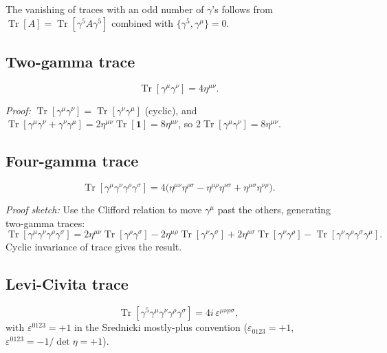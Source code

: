 \documentclass[12pt]{article}
\DeclareMathOperator\Tr{Tr}
\begin{document}
The vanishing of traces with an odd number of $\gamma$'s follows from
$\Tr[A] = \Tr[\gamma^5 A \gamma^5]$ combined with $\{\gamma^5,\gamma^\mu\}=0$.

\subsection{Two-gamma trace}

\begin{mdframed}[backgroundcolor=blue!5]
\begin{equation}\label{eq:tr2}
  \Tr[\gamma^\mu\gamma^\nu] = 4\eta^{\mu\nu}.
\end{equation}
\end{mdframed}

\textit{Proof:} $\Tr[\gamma^\mu\gamma^\nu] = \Tr[\gamma^\nu\gamma^\mu]$ (cyclic),
and $\Tr[\gamma^\mu\gamma^\nu+\gamma^\nu\gamma^\mu] = 2\eta^{\mu\nu}\Tr[\mathbf{1}] = 8\eta^{\mu\nu}$,
so $2\Tr[\gamma^\mu\gamma^\nu] = 8\eta^{\mu\nu}$.

\subsection{Four-gamma trace}

\begin{mdframed}[backgroundcolor=blue!5]
\begin{equation}\label{eq:tr4}
  \Tr[\gamma^\mu\gamma^\nu\gamma^\rho\gamma^\sigma]
  = 4\bigl(\eta^{\mu\nu}\eta^{\rho\sigma}
           - \eta^{\mu\rho}\eta^{\nu\sigma}
           + \eta^{\mu\sigma}\eta^{\nu\rho}\bigr).
\end{equation}
\end{mdframed}

\textit{Proof sketch:} Use the Clifford relation to move $\gamma^\mu$ past the others,
generating two-gamma traces:
\[
  \Tr[\gamma^\mu\gamma^\nu\gamma^\rho\gamma^\sigma]
  = 2\eta^{\mu\nu}\Tr[\gamma^\rho\gamma^\sigma]
  - 2\eta^{\mu\rho}\Tr[\gamma^\nu\gamma^\sigma]
  + 2\eta^{\mu\sigma}\Tr[\gamma^\nu\gamma^\rho]
  - \Tr[\gamma^\nu\gamma^\rho\gamma^\sigma\gamma^\mu].
\]
Cyclic invariance of trace gives the result.

\subsection{Levi-Civita trace}

\begin{mdframed}[backgroundcolor=blue!5]
\begin{equation}\label{eq:tr4g5}
  \Tr[\gamma^5\gamma^\mu\gamma^\nu\gamma^\rho\gamma^\sigma]
  = 4i\,\varepsilon^{\mu\nu\rho\sigma},
\end{equation}
with $\varepsilon^{0123} = +1$ in the Srednicki mostly-plus convention
($\varepsilon_{0123} = +1$, $\varepsilon^{0123} = -1/\det\eta = +1$).
\end{mdframed}
\end{document}

